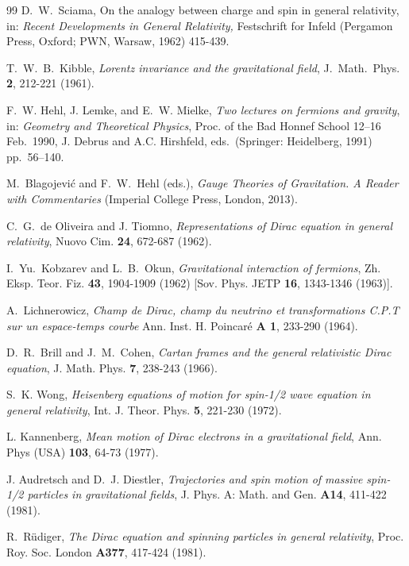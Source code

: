\documentclass[preprint,showpacs,preprintnumbers,eqsecnum,amsmath,amssymb]{revtex4-1}
\begin{document}
\begin{thebibliography}{99}
D.~W.~Sciama, On the analogy between charge and spin in general relativity,
in: {\sl Recent Developments in General Relativity,} Festschrift for Infeld
(Pergamon Press, Oxford; PWN, Warsaw, 1962) 415-439. %

T.~W.~B.~Kibble, {\it Lorentz invariance and the gravitational field},
J.\ Math.\ Phys. {\bf 2}, 212-221 (1961). %

F.~W. Hehl, J. Lemke, and E.~W. Mielke, {\it Two lectures on
fermions and gravity}, in: {\sl Geometry and Theoretical Physics},
Proc. of the Bad Honnef School 12--16 Feb.\ 1990, J. Debrus and
A.C. Hirshfeld, eds.\ (Springer: Heidelberg, 1991) pp.\ 56--140.

M.~Blagojevi\'c and F.~W.~Hehl (eds.), {\sl Gauge Theories of Gravitation.
A Reader with Commentaries} (Imperial College Press, London, 2013).

C.~G.~de Oliveira and J. Tiomno,
{\it Representations of Dirac equation in general relativity},
Nuovo Cim. {\bf 24}, 672-687 (1962). %

I.~Yu.~Kobzarev and L.~B.~Okun, {\it Gravitational interaction of fermions},
Zh. Eksp. Teor. Fiz. {\bf 43}, 1904-1909 (1962) [Sov. Phys. JETP {\bf 16}, 1343-1346 (1963)].

A.~Lichnerowicz, {\it Champ de Dirac, champ du neutrino et transformations
C.P.T sur un espace-temps courbe}
Ann. Inst. H. Poincar\'e {\bf A 1}, 233-290 (1964). %

D.~R.~Brill and J.~M.~Cohen,
{\it Cartan frames and the general relativistic Dirac equation},
J. Math. Phys. {\bf 7}, 238-243 (1966). %

S.~K. Wong, {\it Heisenberg equations of motion for spin-1/2 wave equation
in general relativity}, Int. J. Theor. Phys. {\bf 5}, 221-230 (1972). %

L. Kannenberg, {\it Mean motion of Dirac electrons in a gravitational field},
Ann. Phys (USA) {\bf 103}, 64-73 (1977). %

J. Audretsch and D.~J. Diestler,
{\it Trajectories and spin motion of massive spin-1/2 particles in gravitational fields},
J. Phys. A: Math. and Gen. {\bf A14}, 411-422 (1981). %

R.~R\"udiger, {\it The Dirac equation and spinning particles in general relativity},
Proc. Roy. Soc. London {\bf A377}, 417-424 (1981). %


\end{thebibliography}
\end{document}
